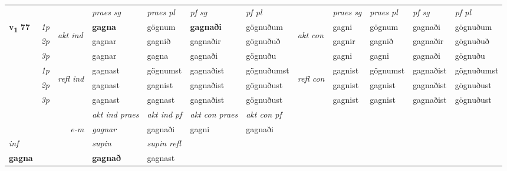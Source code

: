 \begin{longtable}[l]{X>{\footnotesize\itshape}llXXXXlXXXX}
 & &   & \textit{praes sg}  & \textit{praes pl}    & \textit{ pf sg} & \textit{pf pl} & & \textit{praes sg}  & \textit{praes pl}    & \textit{pf sg} & \textit{pf pl }  \\ \cmidrule{4-7} \cmidrule{9-12}
 \multirow{2}{*}{{{\textbf{v{\textsubscript{1}}} \Large{\textbf{77}}}}}  & 1p & \multirow{3}{*}{\begin{turn}{90}\textit{akt ind}\end{turn}} & \textbf{gagna} & gögnum & \textbf{gagnaði} & gögnuðum & \multirow{3}{*}{\begin{turn}{90}\textit{akt con}\end{turn}} &gagni & gögnum & gagnaði & gögnuðum\\*
 & 2p &  &  gagnar  & gagnið & gagnaðir & gögnuðuð & & gagnir & gagnið & gagnaðir & gögnuðuð \\*
 & 3p &  & gagnar & gagna & gagnaði & gögnuðu & & gagni & gagni& gagnaði & gögnuðu \\*
\cmidrule{4-7} \cmidrule{9-12}
 & 1p & \multirow{3}{*}{\begin{turn}{90}\textit{refl ind}\end{turn}}  & gagnast & gögnumst & gagnaðist & gögnuðumst & \multirow{3}{*}{\begin{turn}{90}\textit{refl con}\end{turn}}  &gagnist & gögnumst & gagnaðist & gögnuðumst \\*
 & 2p &  & gagnast & gagnist & gagnaðist & gögnuðust & &gagnist & gagnist & gagnaðist & gögnuðust \\*
 & 3p  & & gagnast & gagnast & gagnaðist & gögnuðust & & gagnist & gagnist& gagnaðist & gögnuðust \\*
\cmidrule{4-7} \cmidrule{9-12}

   && &  \textit{akt ind praes} & \textit{akt ind pf} & \textit{akt con praes} & \textit{akt con pf} \\*
\multicolumn{3}{r}{\textit{e-m}} & gagnar & gagnaði & gagni & gagnaði \\*

\cmidrule{4-7}
   {\textit{inf}} & &      & \textit{supin} & \textit{supin refl}  \\*
  {\textbf{gagna}} & &      &  \textbf{gagnað} & gagnast  \\*

\midrule


\end{longtable}
